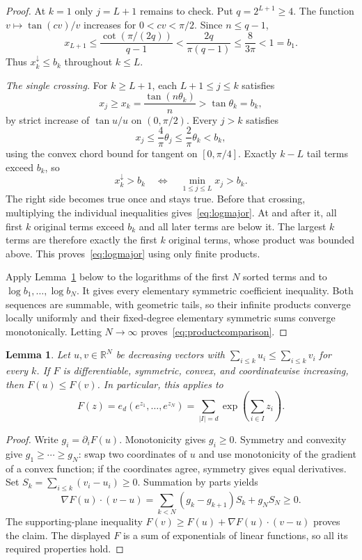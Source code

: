 \documentclass[11pt,a4paper]{article}
\newtheorem{lemma}[theorem]{Lemma}
\theoremstyle{remark}\newtheorem*{ednote}{Editorial note (ProveIt, 2026-10-01)}
\begin{document}
\begin{proof}
At $k=1$ only $j=L+1$ remains to check. Put $q=2^{L+1}\ge4$. The function $v\mapsto\tan(cv)/v$ increases for $0<cv<\pi/2$. Since $n\le q-1$,
\[
 x_{L+1}\le\frac{\cot(\pi/(2q))}{q-1}
 <\frac{2q}{\pi(q-1)}\le\frac8{3\pi}<1=b_1.
\]
Thus $x_k^\downarrow\le b_k$ throughout $k\le L$.

\emph{The single crossing.} For $k\ge L+1$, each $L+1\le j\le k$ satisfies
\[
 x_j\ge x_k=\frac{\tan(n\theta_k)}n>\tan\theta_k=b_k,
\]
by strict increase of $\tan u/u$ on $(0,\pi/2)$. Every $j>k$ satisfies
\[
 x_j\le\frac4\pi\theta_j\le\frac2\pi\theta_k<b_k,
\]
using the convex chord bound for tangent on $[0,\pi/4]$. Exactly $k-L$ tail terms exceed $b_k$, so
\[
 x_k^\downarrow>b_k\quad\Longleftrightarrow\quad
 \min_{1\le j\le L}x_j>b_k.
\]
The right side becomes true once and stays true. Before that crossing, multiplying the individual inequalities gives~\eqref{eq:logmajor}. At and after it, all first $k$ original terms exceed $b_k$ and all later terms are below it. The largest $k$ terms are therefore exactly the first $k$ original terms, whose product was bounded above. This proves~\eqref{eq:logmajor} using only finite products.

Apply Lemma~\ref{lem:majorization} below to the logarithms of the first $N$ sorted terms and to $\log b_1,\ldots,\log b_N$. It gives every elementary symmetric coefficient inequality. Both sequences are summable, with geometric tails, so their infinite products converge locally uniformly and their fixed-degree elementary symmetric sums converge monotonically. Letting $N\to\infty$ proves~\eqref{eq:productcomparison}.
\end{proof}

\begin{lemma}\label{lem:majorization}
Let $u,v\in\mathbb R^N$ be decreasing vectors with
$\sum_{i\le k}u_i\le\sum_{i\le k}v_i$ for every $k$. If $F$ is differentiable, symmetric, convex, and coordinatewise increasing, then $F(u)\le F(v)$. In particular, this applies to
\[
 F(z)=e_d(e^{z_1},\ldots,e^{z_N})
 =\sum_{|I|=d}\exp\left(\sum_{i\in I}z_i\right).
\]
\end{lemma}
\begin{proof}
Write $g_i=\partial_iF(u)$. Monotonicity gives $g_i\ge0$. Symmetry and convexity give $g_1\ge\cdots\ge g_N$: swap two coordinates of $u$ and use monotonicity of the gradient of a convex function; if the coordinates agree, symmetry gives equal derivatives. Set $S_k=\sum_{i\le k}(v_i-u_i)\ge0$. Summation by parts yields
\[
 \nabla F(u)\mathbin{\cdot}(v-u)
 =\sum_{k<N}(g_k-g_{k+1})S_k+g_NS_N\ge0.
\]
The supporting-plane inequality $F(v)\ge F(u)+\nabla F(u)\cdot(v-u)$ proves the claim. The displayed $F$ is a sum of exponentials of linear functions, so all its required properties hold.
\end{proof}
\end{document}
